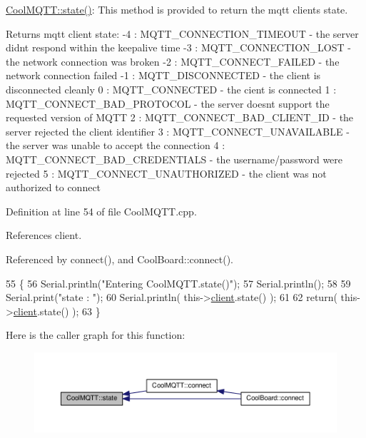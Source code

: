 \hyperlink{classCoolMQTT_a5d003307eff78efbd585e42b43b72b6d}{Cool\+M\+Q\+T\+T\+::state()}\+: This method is provided to return the mqtt client\textquotesingle{}s state. \begin{DoxyReturn}{Returns}
mqtt client state\+: -\/4 \+: M\+Q\+T\+T\+\_\+\+C\+O\+N\+N\+E\+C\+T\+I\+O\+N\+\_\+\+T\+I\+M\+E\+O\+UT -\/ the server didn\textquotesingle{}t respond within the keepalive time -\/3 \+: M\+Q\+T\+T\+\_\+\+C\+O\+N\+N\+E\+C\+T\+I\+O\+N\+\_\+\+L\+O\+ST -\/ the network connection was broken -\/2 \+: M\+Q\+T\+T\+\_\+\+C\+O\+N\+N\+E\+C\+T\+\_\+\+F\+A\+I\+L\+ED -\/ the network connection failed -\/1 \+: M\+Q\+T\+T\+\_\+\+D\+I\+S\+C\+O\+N\+N\+E\+C\+T\+ED -\/ the client is disconnected cleanly 0 \+: M\+Q\+T\+T\+\_\+\+C\+O\+N\+N\+E\+C\+T\+ED -\/ the cient is connected 1 \+: M\+Q\+T\+T\+\_\+\+C\+O\+N\+N\+E\+C\+T\+\_\+\+B\+A\+D\+\_\+\+P\+R\+O\+T\+O\+C\+OL -\/ the server doesn\textquotesingle{}t support the requested version of M\+Q\+TT 2 \+: M\+Q\+T\+T\+\_\+\+C\+O\+N\+N\+E\+C\+T\+\_\+\+B\+A\+D\+\_\+\+C\+L\+I\+E\+N\+T\+\_\+\+ID -\/ the server rejected the client identifier 3 \+: M\+Q\+T\+T\+\_\+\+C\+O\+N\+N\+E\+C\+T\+\_\+\+U\+N\+A\+V\+A\+I\+L\+A\+B\+LE -\/ the server was unable to accept the connection 4 \+: M\+Q\+T\+T\+\_\+\+C\+O\+N\+N\+E\+C\+T\+\_\+\+B\+A\+D\+\_\+\+C\+R\+E\+D\+E\+N\+T\+I\+A\+LS -\/ the username/password were rejected 5 \+: M\+Q\+T\+T\+\_\+\+C\+O\+N\+N\+E\+C\+T\+\_\+\+U\+N\+A\+U\+T\+H\+O\+R\+I\+Z\+ED -\/ the client was not authorized to connect 
\end{DoxyReturn}


Definition at line 54 of file Cool\+M\+Q\+T\+T.\+cpp.



References client.



Referenced by connect(), and Cool\+Board\+::connect().


\begin{DoxyCode}
55 \{
56     Serial.println(\textcolor{stringliteral}{"Entering CoolMQTT.state()"});
57     Serial.println();
58     
59     Serial.print(\textcolor{stringliteral}{"state : "});
60     Serial.println( this->\hyperlink{classCoolMQTT_a4ca71e4f76ef868692a297efd45b1415}{client}.state() );
61     
62     \textcolor{keywordflow}{return}( this->\hyperlink{classCoolMQTT_a4ca71e4f76ef868692a297efd45b1415}{client}.state() );
63 \}
\end{DoxyCode}
Here is the caller graph for this function\+:
\nopagebreak
\begin{figure}[H]
\begin{center}
\leavevmode
\includegraphics[width=350pt]{classCoolMQTT_a5d003307eff78efbd585e42b43b72b6d_icgraph}
\end{center}
\end{figure}


